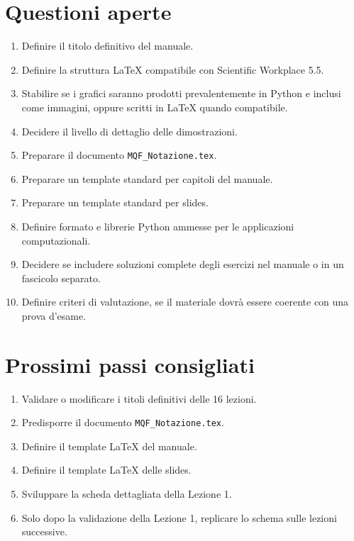 \documentclass[12pt,a4paper]{article}%
\begin{document}
\section{Questioni aperte}

\begin{enumerate}
\item Definire il titolo definitivo del manuale.

\item Definire la struttura LaTeX compatibile con Scientific Workplace 5.5.

\item Stabilire se i grafici saranno prodotti prevalentemente in Python e
inclusi come immagini, oppure scritti in LaTeX quando compatibile.

\item Decidere il livello di dettaglio delle dimostrazioni.

\item Preparare il documento \texttt{MQF\_Notazione.tex}.

\item Preparare un template standard per capitoli del manuale.

\item Preparare un template standard per slides.

\item Definire formato e librerie Python ammesse per le applicazioni computazionali.

\item Decidere se includere soluzioni complete degli esercizi nel manuale o in
un fascicolo separato.

\item Definire criteri di valutazione, se il materiale dovr\`{a} essere
coerente con una prova d'esame.
\end{enumerate}

\section{Prossimi passi consigliati}

\begin{enumerate}
\item Validare o modificare i titoli definitivi delle 16 lezioni.

\item Predisporre il documento \texttt{MQF\_Notazione.tex}.

\item Definire il template LaTeX del manuale.

\item Definire il template LaTeX delle slides.

\item Sviluppare la scheda dettagliata della Lezione 1.

\item Solo dopo la validazione della Lezione 1, replicare lo schema sulle
lezioni successive.
\end{enumerate}
\end{document}
